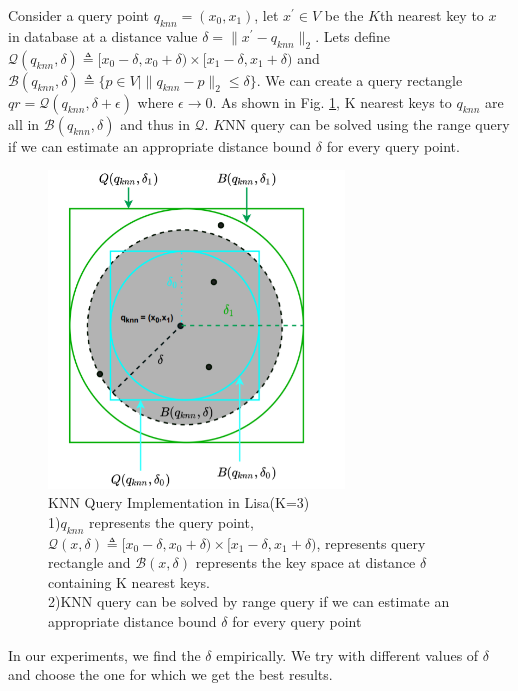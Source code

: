 Consider a query point $q_{knn}=(x_{0},x_{1})$, let $x^{'} \in V$ be the $K$th nearest key to $x$ in database at a distance value $\delta = \| x^{'}-q_{knn}\|_{2} $. Lets define $ \mathcal{Q}(q_{knn},\delta) \triangleq [x_{0}-\delta, x_{0}+\delta) \times[x_{1}-\delta, x_{1}+\delta)$ and $\mathcal{B}(q_{knn}, \delta)  \triangleq \{p \in V \mid \| q_{knn}-p\|_{2} \leq \delta \} $. We can create a query rectangle $qr =  \mathcal{Q}(q_{knn}, \delta + \epsilon)$ where $\epsilon \rightarrow 0$. As shown in Fig. \ref{fig:KNN_Query_Lisa}, K nearest keys to $q_{knn}$ are all in $\mathcal{B}(q_{knn}, \delta)$ and thus in $\mathcal{Q}$. $K$NN query can be solved using the range query if we can estimate an appropriate distance bound $\delta$ for every query point.

\begin{figure}[t]
    \centering
    \includegraphics[width=0.7\textwidth]{graphs/KNN_Query_Lisa.png}
    \caption{KNN Query Implementation in Lisa(K=3)\\
    1)$q_{knn}$ represents the query point, $ \mathcal{Q}(x,\delta) \triangleq [x_{0}-\delta, x_{0}+\delta) \times[x_{1}-\delta, x_{1}+\delta)$, represents query rectangle and $ \mathcal{B}(x, \delta)$ represents the key space at distance $\delta$ containing K nearest keys.\\
    2)KNN query can be solved by range query if we can estimate an appropriate distance bound $\delta$ for every query point\\
    }
    \label{fig:KNN_Query_Lisa}
\end{figure}
In our experiments, we find the $\delta$ empirically. We try with different values of $\delta$ and choose the one for which we get the best results. 